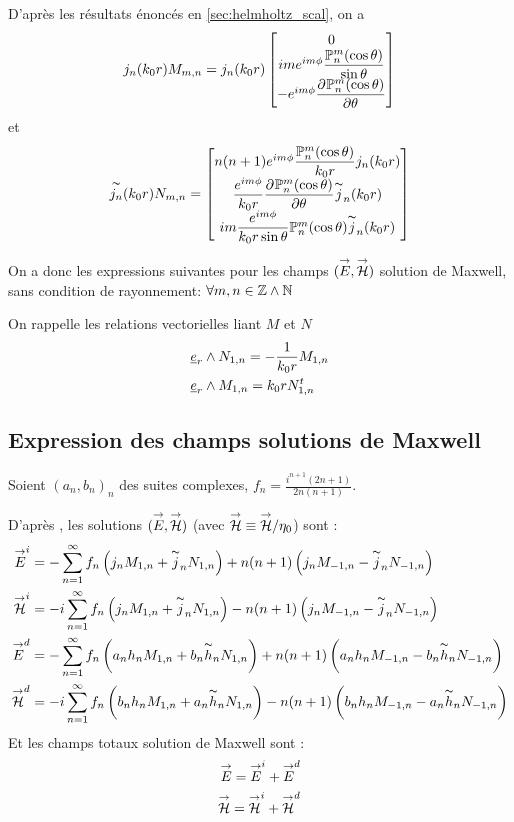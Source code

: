 D'après les résultats énoncés en \ref{sec:helmholtz_scal}, on a
\[
  j_n(k_0r)M_{m,n} = j_n(k_0r)
  \begin{bmatrix}
    0\\
    ime^{im\phi}\dfrac{\mathbb{P}^m_n(\cos\theta)}{\sin\theta}\\
    -e^{im\phi}\dfrac{\partial^{{}} \mathbb{P}^m_n(\cos\theta)}{{\partial \theta}^{{}}}\\
  \end{bmatrix}
\]
et 
\[
  \overset{\thicksim}{j_n}(k_0r)N_{m,n}=
    \begin{bmatrix}
    n(n+1)e^{im\phi}\dfrac{\mathbb{P}^m_n(\cos\theta)}{k_0r}j_n(k_0r)\\
    \dfrac{e^{im\phi}}{k_0r}\dfrac{\partial^{{}} \mathbb{P}^m_n(\cos\theta)}{{\partial \theta}^{{}}}\overset{\thicksim}{j}_n(k_0r)\\
    im\dfrac{e^{im\phi}}{k_0r\sin\theta}\mathbb{P}^m_n(\cos\theta)\overset{\thicksim}{j}_n(k_0r)
  \end{bmatrix}
\]

On a donc les expressions suivantes pour les champs \(({\overset{\rightarrow}{E}},{\overset{\rightarrow}{\mathcal{H}}})\) solution de Maxwell, sans condition de rayonnement:
\(\forall m,n \in \mathbb Z\wedge\mathbb N\)




On rappelle les relations vectorielles liant \(M\) et \(N\)
\begin{align*}
  &\underline{e}_r \wedge N_{1,n} = -\dfrac{1}{k_0r}M_{1,n} \\
  &\underline{e}_r \wedge M_{1,n} = k_0r N_{1,n}^t
\end{align*}

\subsection{Expression des champs solutions de Maxwell}
Soient \((a_n,b_n)_n\) des suites complexes, \(f_n = \frac{i^{n+1}(2n+1)}{2n(n+1)}\).

D’après \cite{morse_methods_1953}, les solutions \(({\overset{\rightarrow}{E}},{\overset{\rightarrow}{\mathcal{H}}})\) (avec \({\overset{\rightarrow}{\mathcal{H}}} \equiv {\overset{\rightarrow}{\mathcal{H}}} /\eta_0 \)) sont :
\begin{align*}
  {\overset{\rightarrow}{E}}^i &= -\sum_{n=1}^\infty f_n \left( j_nM_{1,n} + \overset{\thicksim}{j}_n N_{1,n} \right) + n(n+1)\left(j_n M_{-1,n} - \overset{\thicksim}{j}_nN_{-1,n} \right)\\
  {\overset{\rightarrow}{\mathcal{H}}}^i &= -i\sum_{n=1}^\infty f_n \left( j_nM_{1,n} + \overset{\thicksim}{j}_nN_{1,n} \right) - n(n+1)\left(j_n M_{-1,n} - \overset{\thicksim}{j}_n N_{-1,n} \right)\\
  {\overset{\rightarrow}{E}}^d &= -\sum_{n=1}^\infty f_n \left( a_n h_nM_{1,n} + b_n\overset{\thicksim}{h}_nN_{1,n} \right) + n(n+1)\left(a_nh_nM_{-1,n} - b_n\overset{\thicksim}{h}_nN_{-1,n} \right)\\
  {\overset{\rightarrow}{\mathcal{H}}}^d &= -i\sum_{n=1}^\infty f_n \left( b_nh_nM_{1,n} + a_n\overset{\thicksim}{h}_nN_{1,n} \right) - n(n+1)\left(b_nh_nM_{-1,n} - a_n\overset{\thicksim}{h}_nN_{-1,n} \right)\\
\end{align*}
Et les champs totaux solution de Maxwell sont : 
\begin{align}
  {\overset{\rightarrow}{E}} = {\overset{\rightarrow}{E}}^i + {\overset{\rightarrow}{E}}^d\label{eq:solEmie}\\
  {\overset{\rightarrow}{\mathcal{H}}} = {\overset{\rightarrow}{\mathcal{H}}}^i + {\overset{\rightarrow}{\mathcal{H}}}^d\label{eq:solHmie}
\end{align}

